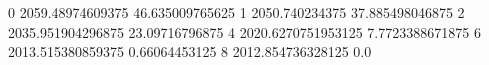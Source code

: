 0 2059.48974609375 46.635009765625
1 2050.740234375 37.885498046875
2 2035.951904296875 23.09716796875
4 2020.6270751953125 7.7723388671875
6 2013.515380859375 0.66064453125
8 2012.854736328125 0.0
